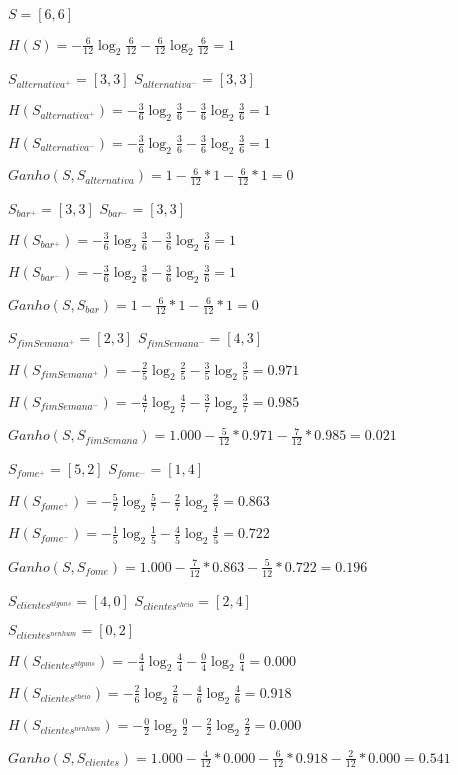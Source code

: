 \par $S = [6,6]$
\par $H(S) = -\frac{6}{12} \log_2 \frac{6}{12}-\frac{6}{12} \log_2 \frac{6}{12} = 1$

\vskip 0.3in
\par $S_{alternativa^+} = [3,3]$ \qquad $S_{alternativa^-} = [3,3]$
\par $H(S_{alternativa^+}) = -\frac{3}{6} \log_2 \frac{3}{6}- \frac{3}{6} \log_2 \frac{3}{6} = 1$
\par $H(S_{alternativa^-}) = -\frac{3}{6} \log_2 \frac{3}{6}- \frac{3}{6} \log_2 \frac{3}{6} = 1$
\par $Ganho(S, S_{alternativa}) = 1-\frac{6}{12} * 1-\frac{6}{12} * 1 = 0$

\vskip 0.3in
\par $S_{bar^+} = [3,3]$ \qquad $S_{bar^-} = [3,3]$
\par $H(S_{bar^+}) = -\frac{3}{6} \log_2 \frac{3}{6}- \frac{3}{6} \log_2 \frac{3}{6} = 1$
\par $H(S_{bar^-}) = -\frac{3}{6} \log_2 \frac{3}{6}- \frac{3}{6} \log_2 \frac{3}{6} = 1$
\par $Ganho(S, S_{bar}) = 1-\frac{6}{12} * 1-\frac{6}{12} * 1 = 0$

\vskip 0.4in
\par $S_{fimSemana^+} = [2,3]$ \qquad $S_{fimSemana^-} = [4,3]$
\par $H(S_{fimSemana^+}) = -\frac{2}{5} \log_2 \frac{2}{5}- \frac{3}{5} \log_2 \frac{3}{5} = 0.971$
\par $H(S_{fimSemana^-}) = -\frac{4}{7} \log_2 \frac{4}{7}- \frac{3}{7} \log_2 \frac{3}{7} = 0.985$
\par $Ganho(S, S_{fimSemana}) = 1.000-\frac{5}{12} * 0.971 -\frac{7}{12} * 0.985 = 0.021$

\vskip 0.3in
\par $S_{fome^+} = [5,2]$ \qquad $S_{fome^-} = [1,4]$
\par $H(S_{fome^+}) = -\frac{5}{7} \log_2 \frac{5}{7}- \frac{2}{7} \log_2 \frac{2}{7} = 0.863$
\par $H(S_{fome^-}) = -\frac{1}{5} \log_2 \frac{1}{5}- \frac{4}{5} \log_2 \frac{4}{5} = 0.722$
\par $Ganho(S, S_{fome}) = 1.000-\frac{7}{12} * 0.863-\frac{5}{12} * 0.722 = 0.196$

\vskip 0.3in
\par $S_{clientes^{alguns}} = [4,0]$ \qquad $S_{clientes^{cheio}} = [2,4]$\par $S_{clientes^{nenhum}} = [0,2]$
\par $H(S_{clientes^{alguns}}) = -\frac{4}{4} \log_2 \frac{4}{4}- \frac{0}{4} \log_2 \frac{0}{4} = 0.000$
\par $H(S_{clientes^{cheio}}) = -\frac{2}{6} \log_2 \frac{2}{6}- \frac{4}{6} \log_2 \frac{4}{6} = 0.918$
\par $H(S_{clientes^{nenhum}}) = -\frac{0}{2} \log_2 \frac{0}{2}- \frac{2}{2} \log_2 \frac{2}{2} = 0.000$
\par $Ganho(S, S_{clientes}) = 1.000-\frac{4}{12} * 0.000-\frac{6}{12} * 0.918-\frac{2}{12} * 0.000 = 0.541$


